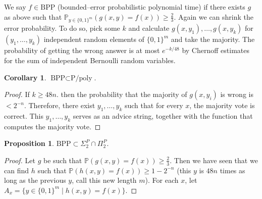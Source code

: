 \documentclass{article}
\theoremstyle{definition}
\newtheorem{cor}[theorem]{Corollary}
\newtheorem{prop}[theorem]{Proposition}
\begin{document}
We say $f \in \text{BPP}$ (bounded--error probabilistic polynomial time) if there exists $g$ as above such that $\mathbb{P}_{y \in \{0,1\}^m}(g(x,y)=f(x))\ge \frac{2}{3}$. Again we can shrink the error probability. To do so, pick some $k$ and calculate $g(x,y_1),\ldots,g(x,y_k)$ for $(y_1,\ldots,y_k)$ independent random elements of $\{0,1\}^m$ and take the majority. The probability of getting the wrong answer is at most $e^{-k/48}$ by Chernoff estimates for the sum of independent Bernoulli random variables.

\begin{cor}
    $\text{BPP} \subset \text{P/poly}$.
\end{cor}
\begin{proof}
    If $k \ge 48n$. then the probability that the majority of $g(x,y_i)$ is wrong is $<2^{-n}$. Therefore, there exist $y_1,\ldots,y_k$ such that for every $x$, the majority vote is correct. This $y_1,\ldots,y_k$ serves as an advice string, together with the function that computes the majority vote.
\end{proof}
\begin{prop}
    $\text{BPP} \subset \Sigma_2^P \cap \Pi_2^P$.
\end{prop}
\begin{proof}
    Let $g$ be such that $\mathbb{P}(g(x,y)=f(x))\ge \frac{2}{3}$. Then we have seen that we can find $h$ such that $\mathbb{P}(h(x,y)=f(x))\ge 1-2^{-n}$ (this $y$ is $48n$ times as long as the previous $y$, call this new length $m$). For each $x$, let $A_x = \{y \in \{0,1\}^m \mid h(x,y)=f(x)\}$.
\end{proof}
\end{document}
